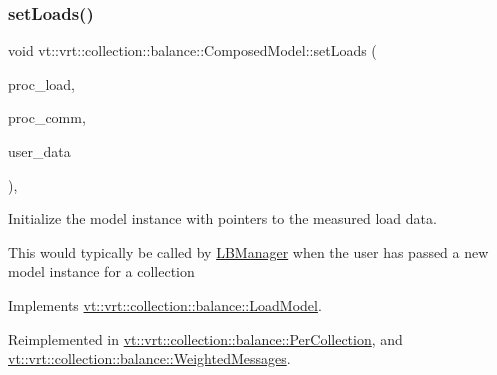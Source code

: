 \subsubsection{\texorpdfstring{set\+Loads()}{setLoads()}}
{\footnotesize\ttfamily void vt\+::vrt\+::collection\+::balance\+::\+Composed\+Model\+::set\+Loads (\begin{DoxyParamCaption}\item[{std\+::unordered\+\_\+map$<$ \hyperlink{namespacevt_a46ce6733d5cdbd735d561b7b4029f6d7}{Phase\+Type}, \hyperlink{namespacevt_1_1vrt_1_1collection_1_1balance_a5339303db2e1ce964d783a53fd74e6b1}{Load\+Map\+Type} $>$ const $\ast$}]{proc\+\_\+load,  }\item[{std\+::unordered\+\_\+map$<$ \hyperlink{namespacevt_a46ce6733d5cdbd735d561b7b4029f6d7}{Phase\+Type}, \hyperlink{namespacevt_1_1vrt_1_1collection_1_1balance_a01ee1fb0ae2da1d2ab7fdca3be9ae351}{Comm\+Map\+Type} $>$ const $\ast$}]{proc\+\_\+comm,  }\item[{std\+::unordered\+\_\+map$<$ \hyperlink{namespacevt_a46ce6733d5cdbd735d561b7b4029f6d7}{Phase\+Type}, \hyperlink{namespacevt_1_1vrt_1_1collection_1_1balance_acf152c668ed9e2e9c6b29784181d2435}{Data\+Map\+Type} $>$ const $\ast$}]{user\+\_\+data }\end{DoxyParamCaption})\hspace{0.3cm}{\ttfamily [override]}, {\ttfamily [virtual]}}



Initialize the model instance with pointers to the measured load data. 

This would typically be called by \hyperlink{structvt_1_1vrt_1_1collection_1_1balance_1_1_l_b_manager}{L\+B\+Manager} when the user has passed a new model instance for a collection 

Implements \hyperlink{structvt_1_1vrt_1_1collection_1_1balance_1_1_load_model_a3de0ef4b35fbdc6e0cb899cfb3cc20ec}{vt\+::vrt\+::collection\+::balance\+::\+Load\+Model}.



Reimplemented in \hyperlink{structvt_1_1vrt_1_1collection_1_1balance_1_1_per_collection_a9158b31a385b34a0109cac3bc0e281a6}{vt\+::vrt\+::collection\+::balance\+::\+Per\+Collection}, and \hyperlink{structvt_1_1vrt_1_1collection_1_1balance_1_1_weighted_messages_aced294a1e3e528a3c6b00051ed2258eb}{vt\+::vrt\+::collection\+::balance\+::\+Weighted\+Messages}.

\mbox{\label{classvt_1_1vrt_1_1collection_1_1balance_1_1_composed_model_ad8108b4392d63b7f09e443920a64933a}} 
